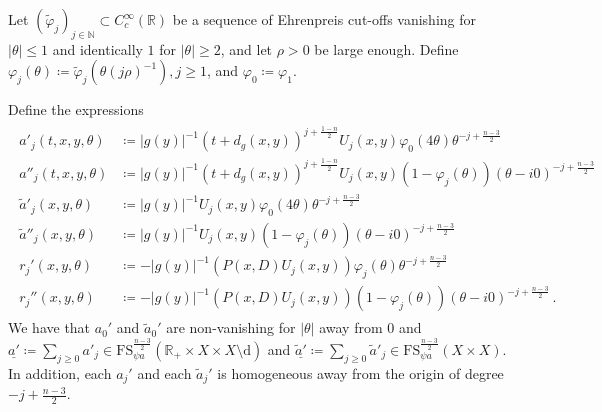 \documentclass[
	fontsize=11pt, 
	twoside=false, 
	abstract=true, 
	a4paper,
]{scrartcl}
\newcommand{\RR}{\mathbb{R}}
\newcommand{\abs}[1]{\left\lvert#1\right\rvert}
\newcommand{\td}[1]{\tilde{#1}}
\newcommand{\ud}[1]{\underline{#1}}
\begin{document}
	\begin{lemma}\label{lem:amplitudes}
	Let $(\td{\varphi}_j)_{j\in\mathbb{N}} \subset C_c^\infty(\RR)$ be a sequence of Ehrenpreis cut-offs vanishing for $\abs{\theta}\leq 1$ and identically $1$ for $\abs{\theta}\geq 2$, and let $\rho > 0$ be large enough. Define $\varphi_j(\theta) \coloneqq \td{\varphi}_j(\theta (j\rho)^{-1}), j\geq 1$, and $\varphi_0 \coloneqq \varphi_1$. 

	Define the expressions
	\begin{align*}
		\begin{aligned}%
		a'_j(t,x,y,\theta) &\coloneqq \abs{g(y)}^{-1}(t+d_g(x,y))^{j+\frac{1-n}{2}} U_j(x,y)\varphi_0(4\theta)\theta^{-j+\frac{n-3}{2}}\\
		a''_j(t,x,y,\theta) &\coloneqq \abs{g(y)}^{-1}(t+d_g(x,y))^{j+\frac{1-n}{2}} U_j(x,y) (1-\varphi_j(\theta))(\theta-i0)^{-j+\frac{n-3}{2}}\\
		\td{a}'_j(x,y,\theta) &\coloneqq \abs{g(y)}^{-1} U_j(x,y) \varphi_0(4\theta)\theta^{-j+\frac{n-3}{2}}\\
		\td{a}''_j(x,y,\theta) &\coloneqq \abs{g(y)}^{-1} U_j(x,y)(1-\varphi_j(\theta))(\theta-i0)^{-j+\frac{n-3}{2}}\\
		r_j'(x,y,\theta) &\coloneq -\abs{g(y)}^{-1} (P(x,D)U_j(x,y)) \varphi_j(\theta) \theta^{-j+\frac{n-3}{2}}\\
		r_j''(x,y,\theta) &\coloneq -\abs{g(y)}^{-1} (P(x,D)U_j(x,y))(1-\varphi_j(\theta))(\theta-i0)^{-j+\frac{n-3}{2}}\,.
		\end{aligned}
	\end{align*}
	We have that $a_0'$ and $\td{a}_0'$ are non-vanishing for $\abs{\theta}$ away from $0$ and $\ud{a'} \coloneqq \sum_{j\geq 0} a'_j \in \mathrm{FS}_{\psi a}^{\frac{n-3}{2}}(\RR_+\times X\times X\setminus\mathrm{d})$ and $\ud{\td{a}'} \coloneqq \sum_{j\geq 0} \td{a}'_j \in \mathrm{FS}_{\psi a}^{\frac{n-3}{2}}(X\times X)$. In addition, each $a_j'$ and each $\td{a}_j'$ is homogeneous away from the origin of degree $-j+\frac{n-3}{2}$.


\end{lemma}
\end{document}

